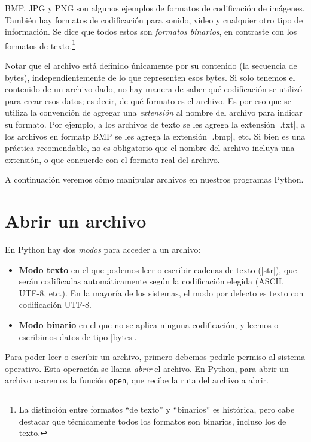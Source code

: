 BMP, JPG y PNG son algunos ejemplos de formatos de codificación de imágenes.
También hay formatos de codificación para sonido, video y cualquier otro tipo
de información. Se dice que todos estos son \emph{formatos binarios}, en
contraste con los formatos de texto.\footnote{La distinción entre formatos
\enquote{de texto} y \enquote{binarios} es histórica, pero cabe destacar que técnicamente
todos los formatos son binarios, incluso los de texto.}

Notar que el archivo está definido únicamente por su contenido (la secuencia de
bytes), independientemente de lo que representen esos bytes. Si solo tenemos el
contenido de un archivo dado, no hay manera de saber qué codificación se
utilizó para crear esos datos; es decir, de qué formato es el archivo. Es por
eso que se utiliza la convención de agregar una \emph{extensión} al nombre del
archivo para indicar su formato. Por ejemplo, a los archivos de texto se les
agrega la extensión |.txt|, a los archivos en formatp BMP se les agrega la
extensión |.bmp|, etc. Si bien es una práctica recomendable, no es obligatorio
que el nombre del archivo incluya una extensión, o que concuerde con el formato
real del archivo.

A continuación veremos cómo manipular archivos en nuestros programas Python.

\section{Abrir un archivo}

En Python hay dos \emph{modos} para acceder a un archivo:

\begin{itemize}
    \item {\bf Modo texto} en el que podemos leer o escribir cadenas de texto (|str|), que
        serán codificadas automáticamente según la codificación elegida (ASCII, UTF-8, etc.).
        En la mayoría de los sistemas, el modo por defecto es texto con codificación UTF-8.
    \item {\bf Modo binario} en el que no se aplica ninguna codificación, y leemos o escribimos
        datos de tipo |bytes|.
\end{itemize}

Para poder leer o escribir un archivo, primero debemos pedirle permiso al
sistema operativo. Esta operación se llama \emph{abrir} el archivo. En Python,
para abrir un archivo usaremos la función \lstinline!open!, que recibe la
ruta del archivo a abrir.

